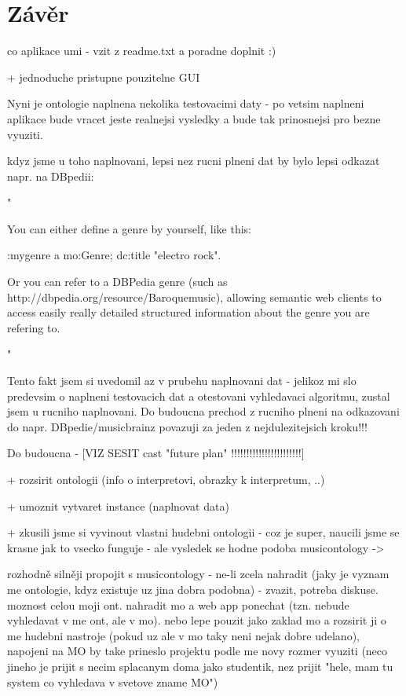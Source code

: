 \chapter{Závěr}

co aplikace umi - vzit z readme.txt a poradne doplnit :)

+ jednoduche pristupne pouzitelne GUI

Nyni je ontologie naplnena nekolika testovacimi daty - po vetsim naplneni aplikace bude vracet jeste realnejsi vysledky a bude tak prinosnejsi pro bezne vyuziti.


kdyz jsme u toho naplnovani, lepsi nez rucni plneni dat by bylo lepsi odkazat napr. na DBpedii:

"

You can either define a genre by yourself, like this:

		:mygenre a mo:Genre; dc:title "electro rock".

		Or you can refer to a DBPedia genre (such as http://dbpedia.org/resource/Baroquemusic), allowing semantic web
		clients to access easily really detailed structured information about the genre you are refering to.
		
		"
		
Tento fakt jsem si uvedomil az v prubehu naplnovani dat - jelikoz mi slo predevsim o naplneni testovacich dat a otestovani vyhledavaci algoritmu, zustal jsem u rucniho naplnovani. Do budoucna prechod z rucniho plneni na odkazovani do napr. DBpedie/musicbrainz povazuji za jeden z nejdulezitejsich kroku!!!		

Do budoucna - [VIZ SESIT cast "future plan" !!!!!!!!!!!!!!!!!!!!!!!]

+ rozsirit ontologii (info o interpretovi, obrazky k interpretum, ..)

+ umoznit vytvaret instance (naplnovat data)

+ zkusili jsme si vyvinout vlastni hudebni ontologii - coz je super, naucili jsme se krasne jak to vsecko funguje - ale vysledek se hodne podoba musicontology ->

   rozhodně silněji propojit s musicontology - ne-li zcela nahradit (jaky je vyznam me ontologie, kdyz existuje uz jina dobra podobna) - zvazit, potreba diskuse. moznost celou moji ont. nahradit mo a web app ponechat (tzn. nebude vyhledavat v me ont, ale v mo). nebo lepe pouzit jako zaklad mo a rozsirit ji o me hudebni nastroje (pokud uz ale v mo taky neni nejak dobre udelano), napojeni na MO by take prineslo projektu podle me novy rozmer vyuziti (neco jineho je prijit s necim splacanym doma jako studentik, nez prijit "hele, mam tu system co vyhledava v svetove zname MO")


